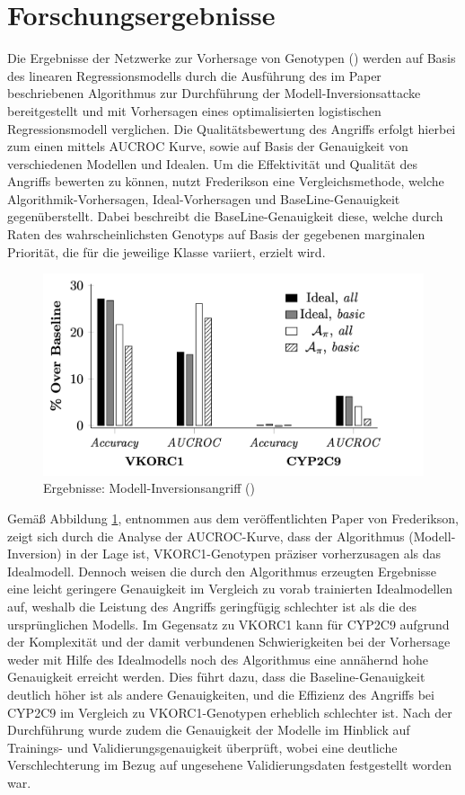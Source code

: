 \section{Forschungsergebnisse}\label{chpt:MIAttacksResearch}
Die Ergebnisse der Netzwerke zur Vorhersage von Genotypen (\cite[S. 7 ff.]{fredrikson_privacy_2014}) werden auf Basis des linearen Regressionsmodells durch die Ausführung des im Paper beschriebenen Algorithmus zur Durchführung der Modell-Inversionsattacke bereitgestellt und mit Vorhersagen eines optimalisierten logistischen Regressionsmodell verglichen. Die Qualitätsbewertung des Angriffs erfolgt hierbei zum einen mittels \glqq AUCROC\grqq{} Kurve, sowie auf Basis der Genauigkeit von verschiedenen Modellen und Idealen. Um die Effektivität und Qualität des Angriffs bewerten zu können, nutzt Frederikson eine Vergleichsmethode, welche Algorithmik-Vorhersagen, Ideal-Vorhersagen und BaseLine-Genauigkeit gegenüberstellt. Dabei beschreibt die BaseLine-Genauigkeit diese, welche durch Raten des wahrscheinlichsten Genotyps auf Basis der gegebenen marginalen Priorität, die für die jeweilige Klasse variiert, erzielt wird.
\begin{figure}[H]
	\centering
	\includegraphics[width=0.6\linewidth]{Bilder/paper_fred_2014_graph.png}
	\caption{Ergebnisse: Modell-Inversionsangriff (\cite[S. 7, Figure 3]{fredrikson_privacy_2014})}
	\label{img:frederikson_evaluation}
\end{figure}
Gemäß Abbildung \ref{img:frederikson_evaluation}, entnommen aus dem veröffentlichten Paper von Frederikson, zeigt sich durch die Analyse der AUCROC-Kurve, dass der Algorithmus (Modell-Inversion) in der Lage ist, VKORC1-Genotypen präziser vorherzusagen als das Idealmodell. Dennoch weisen die durch den Algorithmus erzeugten Ergebnisse eine leicht geringere Genauigkeit im Vergleich zu vorab trainierten Idealmodellen auf, weshalb die Leistung des Angriffs geringfügig schlechter ist als die des ursprünglichen Modells.
Im Gegensatz zu VKORC1 kann für CYP2C9 aufgrund der Komplexität und der damit verbundenen Schwierigkeiten bei der Vorhersage weder mit Hilfe des Idealmodells noch des Algorithmus eine annähernd hohe Genauigkeit erreicht werden. Dies führt dazu, dass die Baseline-Genauigkeit deutlich höher ist als andere Genauigkeiten, und die Effizienz des Angriffs bei CYP2C9 im Vergleich zu VKORC1-Genotypen erheblich schlechter ist.
Nach der Durchführung wurde zudem die Genauigkeit der Modelle im Hinblick auf Trainings- und Validierungsgenauigkeit überprüft, wobei eine deutliche Verschlechterung im Bezug auf ungesehene Validierungsdaten festgestellt worden war.

